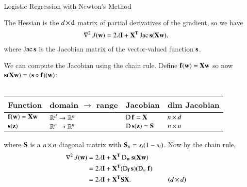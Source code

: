 \documentclass[section]{problemset}
\begin{document}
\begin{problem}{Logistic Regression with Newton's Method}
\begin{enumerate}
\begin{comment}
\begin{mdframed}
\textbf{Second version, not using chain rule}:
Using $\X_{.j}$ to denote the $n$-vector containing the $j$-th feature
values, the $j$-th component of the gradient is
\begin{align*}
  \partiald{J}{w_j} = 2\lambda w_j - \X_{.j}\cdot \y + \X_{.j} \cdot s(\X\w),
\end{align*}
so the $(j,k)$-th entry of the Hessian is
\begin{align*}
  \partiald{}{w_k}\partiald{J}{w_j}
  &= \sum_i x_{ij} \partiald{~s(\x_i\cdot \w)}{w_k} \\
  &= 2\lambda 1_{\{j = k\}} + \sum_i x_{ij} x_{ik} s_i(\w)(1 - s_i(\w)) \\
  &= \X^\T \B \X,
\end{align*}
where $\B$ is an $(n \times n)$ diagonal matrix with
$B_{ii} = s_i(\w)(1-s_i(\w) + 2\lambda$, and $1_{\{\cdot\}}$ is an indicator
function that takes the value 1 when its argument is true and 0 otherwise.
\end{mdframed}
\end{comment}

\begin{mdframed}
The Hessian is the $d \by \d$ matrix of partial derivatives of the gradient,
so we have
\begin{align*}
  \hess J(\w) = 2\lambda\I + \X^\T \Jac \s(\X\w),
\end{align*}
where $\Jac \s$ is the Jacobian matrix of the vector-valued function $\s$.

We can compute the Jacobian using the chain rule. Define $\f(\w) = \X\w$ so now
$\s(\X\w) = (\s \circ \f)(\w)$:
\\\\
\begin{tabular}{l | l | l | l}
  Function         & domain $\to$ range    & Jacobian                               & dim Jacobian \\
  \hline
  $\f(\w) = \X\w$  &$\R^d \rightarrow \R^n$ &$\D\f = \X$                            & $n \by d$\\
  $\s(\z)$         &$\R^n \rightarrow \R^n$ &$\D\s(\z) = \S$ & $n \by n$
\end{tabular}

where $\S$ is a $n \by n$ diagonal matrix with $\S_{ii} = s_i(1 - s_i)$. Now by
the chain rule,
\begin{align*}
\hess J(\w) &= 2\lambda\I + \X^\T \D_\w \s(\X\w) \\
            &= 2\lambda\I + \X^\T (\D_\f \s) (\D_w \f) \\
            &= 2\lambda\I + \X^\T\S\X.  ~~~~~~~~~~~~~~~~~~~~~~ (d \by d)
\end{align*}
\end{mdframed}



\end{enumerate}
\end{problem}
\end{document}
